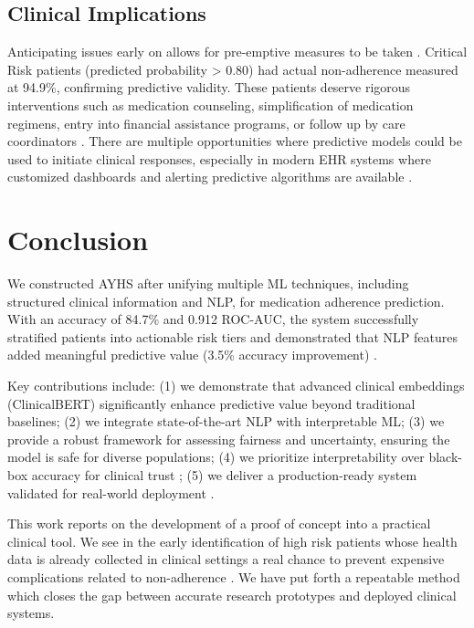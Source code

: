 \documentclass{article}
\begin{document}
\subsection{Clinical Implications}\label{subsec:clinical}

Anticipating issues early on allows for pre-emptive measures to be taken \cite{glass2025}. Critical Risk patients (predicted probability > 0.80) had actual non-adherence measured at 94.9\%, confirming predictive validity. These patients deserve rigorous interventions such as medication counseling, simplification of medication regimens, entry into financial assistance programs, or follow up by care coordinators \cite{brown2016,baumgartner2018}. There are multiple opportunities where predictive models could be used to initiate clinical responses, especially in modern EHR systems where customized dashboards and alerting predictive algorithms are available .



\section{Conclusion}\label{sec:conclusion}

We constructed AYHS after unifying multiple ML techniques, including structured clinical information and NLP, for medication adherence prediction. With an accuracy of 84.7\% and 0.912 ROC-AUC, the system successfully stratified patients into actionable risk tiers and demonstrated that NLP features added meaningful predictive value (3.5\% accuracy improvement) \cite{vanbulck2024,villanueva2025}.

Key contributions include: (1) we demonstrate that advanced clinical embeddings (ClinicalBERT) significantly enhance predictive value beyond traditional baselines; (2) we integrate state-of-the-art NLP with interpretable ML; (3) we provide a robust framework for assessing fairness and uncertainty, ensuring the model is safe for diverse populations; (4) we prioritize interpretability over black-box accuracy for clinical trust \cite{longo2024,shipe2019}; (5) we deliver a production-ready system validated for real-world deployment \cite{glass2025}.

This work reports on the development of a proof of concept into a practical clinical tool. We see in the early identification of high risk patients whose health data is already collected in clinical settings a real chance to prevent expensive complications related to non-adherence \cite{cutler2018,viswanathan2012}. We have put forth a repeatable method which closes the gap between accurate research prototypes and deployed clinical systems.
\end{document}
